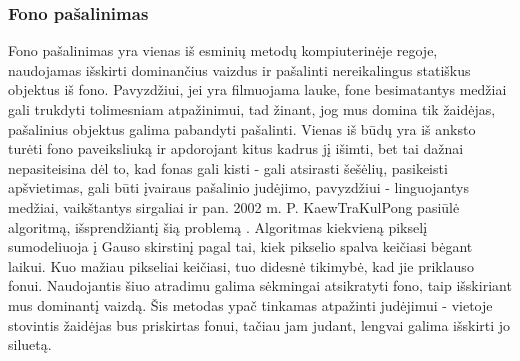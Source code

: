 \documentclass{VUMIFPSbakalaurinis}
\begin{document}
\subsubsection{Fono pašalinimas}
Fono pašalinimas yra vienas iš esminių metodų kompiuterinėje regoje, naudojamas išskirti dominančius vaizdus ir pašalinti nereikalingus statiškus objektus iš fono. Pavyzdžiui, jei yra filmuojama lauke, fone besimatantys medžiai gali trukdyti tolimesniam atpažinimui, tad žinant, jog mus domina tik žaidėjas, pašalinius objektus galima pabandyti pašalinti. Vienas iš būdų yra iš anksto turėti fono paveiksliuką ir apdorojant kitus kadrus jį išimti, bet tai dažnai nepasiteisina dėl to, kad fonas gali kisti - gali atsirasti šešėlių, pasikeisti apšvietimas, gali būti įvairaus pašalinio judėjimo, pavyzdžiui - linguojantys medžiai, vaikštantys sirgaliai ir pan. 2002 m.  P. KaewTraKulPong pasiūlė algoritmą, išsprendžiantį šią problemą \cite{KaewTraKulPong2002}. Algoritmas kiekvieną pikselį sumodeliuoja į Gauso skirstinį pagal tai, kiek pikselio spalva keičiasi bėgant laikui. Kuo mažiau pikseliai keičiasi, tuo didesnė tikimybė, kad jie priklauso fonui. Naudojantis šiuo atradimu galima sėkmingai atsikratyti fono, taip išskiriant mus dominantį vaizdą. Šis metodas ypač tinkamas atpažinti judėjimui - vietoje stovintis žaidėjas bus priskirtas fonui, tačiau jam judant, lengvai galima išskirti jo siluetą.  
\end{document}
